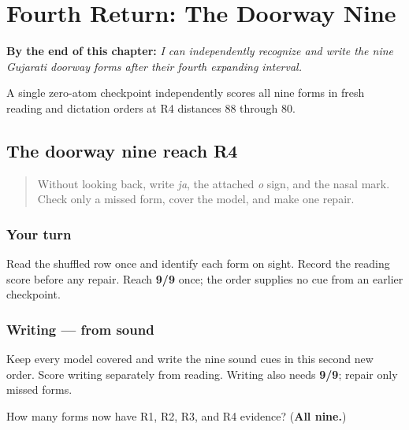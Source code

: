 
\chapter{Fourth Return: The Doorway Nine}
\label{ch:gu-doorway-r4}

\begin{chapteropening}
\textbf{By the end of this chapter:} \emph{I can independently recognize and write the nine Gujarati doorway forms after their fourth expanding interval.}

A single zero-atom checkpoint independently scores all nine forms in fresh reading and dictation orders at R4 distances 88 through 80.
\end{chapteropening}

\section[\texorpdfstring{\gu{ો} \gu{ક} \gu{ં} \gu{જ} \gu{ી} \gu{ણ} \gu{છ} \gu{શ} \gu{ુ} (o sign — ka …)}{ો ક ં જ ી ણ છ શ ુ (o sign — ka …)}]{The doorway nine reach R4}

\label{lesson:GU-R19-doorway-nine-r4}



\begin{quote}
Without looking back, write \emph{ja}, the attached \emph{o} sign, and the nasal mark. Check only a missed form, cover the model, and make one repair.
\end{quote}

\subsection*{Your turn}
Read the shuffled row once and identify each form on sight. Record the reading score before any repair. Reach \textbf{9/9} once; the order supplies no cue from an earlier checkpoint.

\subsection*{Writing — from sound}

Keep every model covered and write the nine sound cues in this second new order. Score writing separately from reading. Writing also needs \textbf{9/9}; repair only missed forms.

\begin{tcolorbox}[breakable,colback=teal!4,colframe=teal!35!black,title={Before you move on}]
How many forms now have R1, R2, R3, and R4 evidence? (\textbf{All nine.})
\end{tcolorbox}
